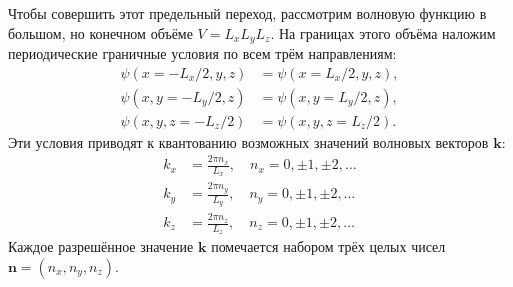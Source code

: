 \documentclass[a4paper, 12pt]{article}
\begin{document}
Чтобы совершить этот предельный переход, рассмотрим волновую функцию в большом, но конечном объёме $V = L_x L_y L_z$. На границах этого объёма наложим периодические граничные условия по всем трём направлениям:
\begin{align*}
\psi(x = -L_x/2, y, z) &= \psi(x = L_x/2, y, z), \\
\psi(x, y = -L_y/2, z) &= \psi(x, y = L_y/2, z), \\
\psi(x, y, z = -L_z/2) &= \psi(x, y, z = L_z/2).
\end{align*}
Эти условия приводят к квантованию возможных значений волновых векторов $\bm{k}$:
\begin{align*}
k_x &= \frac{2\pi n_x}{L_x}, \quad n_x = 0, \pm 1, \pm 2, \dots \\
k_y &= \frac{2\pi n_y}{L_y}, \quad n_y = 0, \pm 1, \pm 2, \dots \\
k_z &= \frac{2\pi n_z}{L_z}, \quad n_z = 0, \pm 1, \pm 2, \dots
\end{align*}
Каждое разрешённое значение $\bm{k}$ помечается набором трёх целых чисел $\bm{n} = (n_x, n_y, n_z)$.
\end{document}
